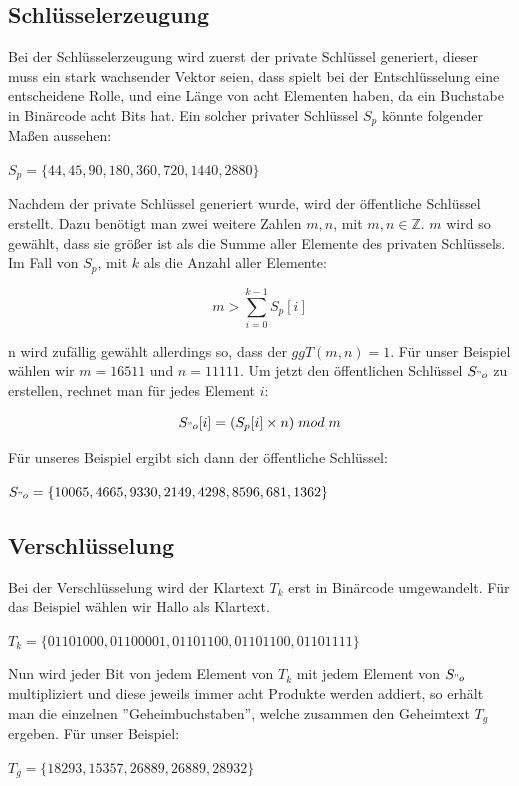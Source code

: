 \documentclass[a4paper,12pt,titlepage]{article}
\begin{document}
\subsection{Schlüsselerzeugung}
Bei der Schlüsselerzeugung wird zuerst der private Schlüssel generiert, dieser muss ein stark wachsender Vektor seien, dass spielt bei der Entschlüsselung eine entscheidene Rolle, und eine Länge von acht Elementen haben, da ein Buchstabe in Binärcode acht Bits hat. Ein solcher privater Schlüssel $S_p$ könnte folgender Maßen aussehen:
\begin{center}
$S_p=\{44,45,90,180,360,720,1440,2880\}$
\end{center}
Nachdem der private Schlüssel generiert wurde, wird der öffentliche Schlüssel erstellt. Dazu benötigt man zwei weitere Zahlen $m,n$, mit $m,n \in \mathbb{Z}$. $m$ wird so gewählt, dass sie größer ist als die Summe aller Elemente des privaten Schlüssels. Im Fall von $S_p$, mit $k$ als die Anzahl aller Elemente:
\begin{center}
\[m > \sum_{i=0}^{k-1} S_p[i]\]
\end{center}
n wird zufällig gewählt allerdings so, dass der $ggT(m, n) = 1$.
Für unser Beispiel wählen wir $m = 16511$ und $n = 11111$. Um jetzt den öffentlichen Schlüssel $S_{"o}$ zu erstellen, rechnet man für jedes Element $i$:
\begin{center}
\[S_{"o}[i]=(S_p[i] \times n)\; mod \; m\]
\end{center}
Für unseres Beispiel ergibt sich dann der öffentliche Schlüssel:
\begin{center}
$S_{"o}=\{10065,4665,9330,2149,4298,8596,681,1362\}$
\end{center}

\subsection{Verschlüsselung}
Bei der Verschlüsselung wird der Klartext $T_k$ erst in Binärcode umgewandelt. Für das Beispiel wählen wir Hallo als Klartext.
\begin{center}
$T_k = \{01101000, 01100001, 01101100, 01101100, 01101111\}$
\end{center} 
Nun wird jeder Bit von jedem Element von $T_k$ mit jedem Element von $S_{"o}$ multipliziert und diese jeweils immer acht Produkte werden addiert, so erhält man die einzelnen ''Geheimbuchstaben'', welche zusammen den Geheimtext $T_g$ ergeben.
Für unser Beispiel:
\begin{center}
$T_g=\{18293,15357,26889,26889,28932\}$
\end{center} 
\end{document}
